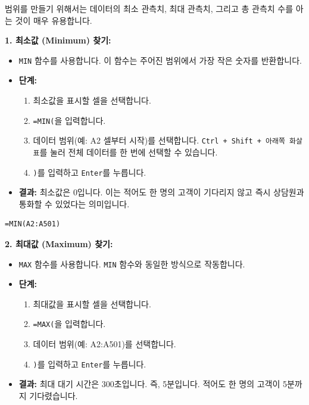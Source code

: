\documentclass[11pt,a4paper]{article}
\theoremstyle{definition}
\begin{document}
\begin{tcolorbox}[title={최소값, 최대값, 개수 찾기 (Finding Min, Max, Count)}]
범위를 만들기 위해서는 데이터의 최소 관측치, 최대 관측치, 그리고 총 관측치 수를 아는 것이 매우 유용합니다.

\begin{center}
\label{fig:excel_min_max_count_setup}
\end{center}

\textbf{1. 최소값 (Minimum) 찾기:}
\begin{itemize}
    \item \texttt{MIN} 함수를 사용합니다. 이 함수는 주어진 범위에서 가장 작은 숫자를 반환합니다.
    \item \textbf{단계:}
    \begin{enumerate}
        \item 최소값을 표시할 셀을 선택합니다.
        \item \texttt{=MIN(}을 입력합니다.
        \item 데이터 범위(예: A2 셀부터 시작)를 선택합니다. \texttt{Ctrl + Shift + 아래쪽 화살표}를 눌러 전체 데이터를 한 번에 선택할 수 있습니다.
        \item \texttt{)}를 입력하고 \texttt{Enter}를 누릅니다.
    \end{enumerate}
    \item \textbf{결과:} 최소값은 0입니다. 이는 적어도 한 명의 고객이 기다리지 않고 즉시 상담원과 통화할 수 있었다는 의미입니다.
\end{itemize}

\begin{lstlisting}[caption={Excel MIN 함수 사용 예시}, label={lst:excel_min}]
=MIN(A2:A501)
\end{lstlisting}

\textbf{2. 최대값 (Maximum) 찾기:}
\begin{itemize}
    \item \texttt{MAX} 함수를 사용합니다. \texttt{MIN} 함수와 동일한 방식으로 작동합니다.
    \item \textbf{단계:}
    \begin{enumerate}
        \item 최대값을 표시할 셀을 선택합니다.
        \item \texttt{=MAX(}을 입력합니다.
        \item 데이터 범위(예: A2:A501)를 선택합니다.
        \item \texttt{)}를 입력하고 \texttt{Enter}를 누릅니다.
    \end{enumerate}
    \item \textbf{결과:} 최대 대기 시간은 300초입니다. 즉, 5분입니다. 적어도 한 명의 고객이 5분까지 기다렸습니다.
\end{itemize}


\end{tcolorbox}
\end{document}
